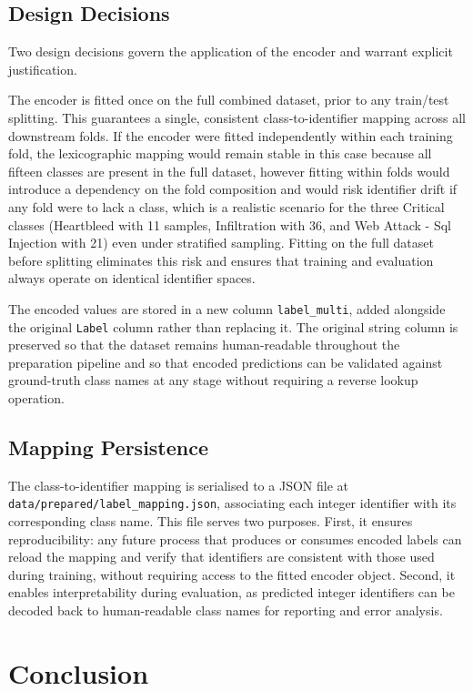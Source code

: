 \documentclass[12pt,a4paper]{article}
\begin{document}
\subsection{Design Decisions}

Two design decisions govern the application of the encoder and warrant explicit
justification.

The encoder is fitted once on the full combined dataset, prior to any train/test
splitting. This guarantees a single, consistent class-to-identifier mapping across
all downstream folds. If the encoder were fitted independently within each training
fold, the lexicographic mapping would remain stable in this case because all fifteen
classes are present in the full dataset, however fitting within folds would
introduce a dependency on the fold composition and would risk identifier drift if any fold
were to lack a class, which is a realistic scenario for the three Critical classes
(Heartbleed with 11 samples, Infiltration with 36, and Web Attack - Sql Injection
with 21) even under stratified sampling. Fitting on the full dataset before splitting
eliminates this risk and ensures that training and evaluation always operate on
identical identifier spaces.

The encoded values are stored in a new column \texttt{label\_multi}, added alongside
the original \texttt{Label} column rather than replacing it. The original string
column is preserved so that the dataset remains human-readable throughout the
preparation pipeline and so that encoded predictions can be validated against
ground-truth class names at any stage without requiring a reverse lookup operation.

\subsection{Mapping Persistence}

The class-to-identifier mapping is serialised to a JSON file at
\texttt{data/prepared/label\_mapping.json}, associating each integer identifier
with its corresponding class name. This file serves two purposes. First, it ensures
reproducibility: any future process that produces or consumes encoded labels can
reload the mapping and verify that identifiers are consistent with those used during
training, without requiring access to the fitted encoder object. Second, it enables
interpretability during evaluation, as predicted integer identifiers can be decoded
back to human-readable class names for reporting and error analysis.

\section{Conclusion}
\end{document}

